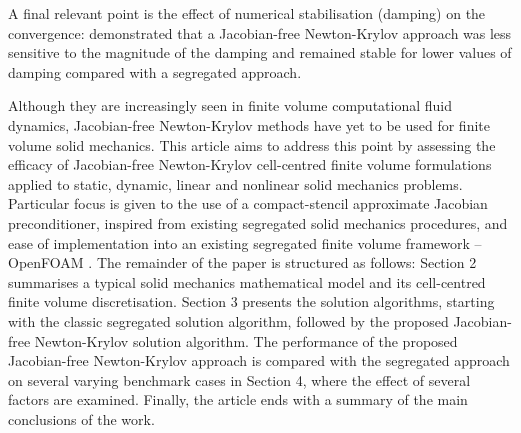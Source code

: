 \documentclass[sn-mathphys,Numbered]{sn-jnl}%
\begin{document}
A final relevant point is the effect of numerical stabilisation (damping) on the convergence: \citet{Nishikawa2017} demonstrated that a Jacobian-free Newton-Krylov approach was less sensitive to the magnitude of the damping and remained stable for lower values of damping compared with a segregated approach.


Although they are increasingly seen in finite volume computational fluid dynamics, Jacobian-free Newton-Krylov methods have yet to be used for finite volume solid mechanics.
This article aims to address this point by assessing the efficacy of Jacobian-free Newton-Krylov cell-centred finite volume formulations applied to static, dynamic, linear and nonlinear solid mechanics problems.
Particular focus is given to the use of a compact-stencil approximate Jacobian preconditioner, inspired from existing segregated solid mechanics procedures, and ease of implementation into an existing segregated finite volume framework -- OpenFOAM \citep{Weller1998}.
The remainder of the paper is structured as follows:
Section 2 summarises a typical solid mechanics mathematical model and its cell-centred finite volume discretisation.
Section 3 presents the solution algorithms, starting with the classic segregated solution algorithm, followed by the proposed Jacobian-free Newton-Krylov solution algorithm.
The performance of the proposed Jacobian-free Newton-Krylov approach is compared with the segregated approach on several varying benchmark cases in Section 4, where the effect of several factors are examined. %
Finally, the article ends with a summary of the main conclusions of the work.
\end{document}
